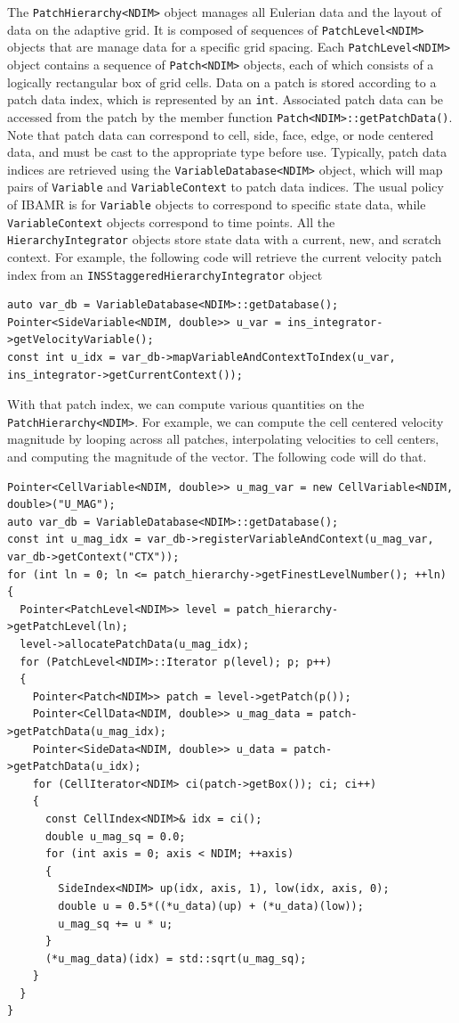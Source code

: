 \documentclass{article}
\begin{document}
The \verb|PatchHierarchy<NDIM>| object manages all Eulerian data and the layout of data on the adaptive grid. It is composed of sequences of \verb|PatchLevel<NDIM>| objects that are manage data for a specific grid spacing. Each \verb|PatchLevel<NDIM>| object contains a sequence of \verb|Patch<NDIM>| objects, each of which consists of a logically rectangular box of grid cells. Data on a patch is stored according to a patch data index, which is represented by an \verb|int|. Associated patch data can be accessed from the patch by the member function \verb|Patch<NDIM>::getPatchData()|. Note that patch data can correspond to cell, side, face, edge, or node centered data, and must be cast to the appropriate type before use. Typically, patch data indices are retrieved using the \verb|VariableDatabase<NDIM>| object, which will map pairs of \verb|Variable| and \verb|VariableContext| to patch data indices. The usual policy of IBAMR is for \verb|Variable| objects to correspond to specific state data, while \verb|VariableContext| objects correspond to time points. All the \verb|HierarchyIntegrator| objects store state data with a current, new, and scratch context. For example, the following code will retrieve the current velocity patch index from an \verb|INSStaggeredHierarchyIntegrator| object
\begin{verbatim}
auto var_db = VariableDatabase<NDIM>::getDatabase();
Pointer<SideVariable<NDIM, double>> u_var = ins_integrator->getVelocityVariable();
const int u_idx = var_db->mapVariableAndContextToIndex(u_var, ins_integrator->getCurrentContext());
\end{verbatim}
With that patch index, we can compute various quantities on the \verb|PatchHierarchy<NDIM>|. For example, we can compute the cell centered velocity magnitude by looping across all patches, interpolating velocities to cell centers, and computing the magnitude of the vector. The following code will do that.
\begin{verbatim}
Pointer<CellVariable<NDIM, double>> u_mag_var = new CellVariable<NDIM, double>("U_MAG");
auto var_db = VariableDatabase<NDIM>::getDatabase();
const int u_mag_idx = var_db->registerVariableAndContext(u_mag_var, var_db->getContext("CTX"));
for (int ln = 0; ln <= patch_hierarchy->getFinestLevelNumber(); ++ln)
{
  Pointer<PatchLevel<NDIM>> level = patch_hierarchy->getPatchLevel(ln);
  level->allocatePatchData(u_mag_idx);
  for (PatchLevel<NDIM>::Iterator p(level); p; p++)
  {
    Pointer<Patch<NDIM>> patch = level->getPatch(p());
    Pointer<CellData<NDIM, double>> u_mag_data = patch->getPatchData(u_mag_idx);
    Pointer<SideData<NDIM, double>> u_data = patch->getPatchData(u_idx);
    for (CellIterator<NDIM> ci(patch->getBox()); ci; ci++)
    {
      const CellIndex<NDIM>& idx = ci();
      double u_mag_sq = 0.0;
      for (int axis = 0; axis < NDIM; ++axis)
      {
        SideIndex<NDIM> up(idx, axis, 1), low(idx, axis, 0);
        double u = 0.5*((*u_data)(up) + (*u_data)(low));
        u_mag_sq += u * u;
      }
      (*u_mag_data)(idx) = std::sqrt(u_mag_sq);
    }
  }
}
\end{verbatim}
\end{document}
